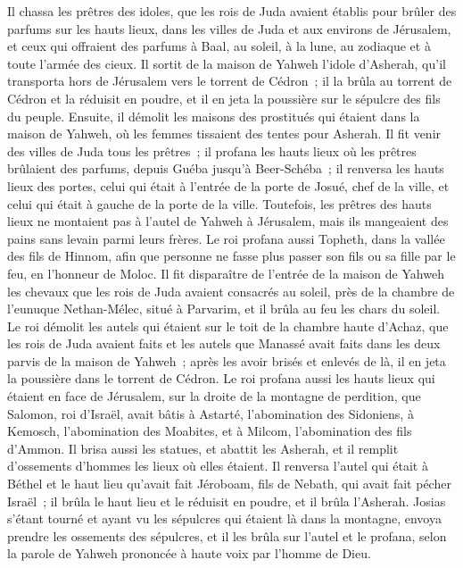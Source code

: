 \begin{multicols}{2}
Il chassa les prêtres des idoles, que les rois de Juda avaient établis pour brûler des parfums sur les hauts lieux, dans les villes de Juda et aux environs de Jérusalem, et ceux qui offraient des parfums à Baal, au soleil, à la lune, au zodiaque et à toute l'armée des cieux.
Il sortit de la maison de Yahweh l'idole d'Asherah, qu'il transporta hors de Jérusalem vers le torrent de Cédron~; il la brûla au torrent de Cédron et la réduisit en poudre, et il en jeta la poussière sur le sépulcre des fils du peuple.
Ensuite, il démolit les maisons des prostitués qui étaient dans la maison de Yahweh, où les femmes tissaient des tentes pour Asherah.
Il fit venir des villes de Juda tous les prêtres~; il profana les hauts lieux où les prêtres brûlaient des parfums, depuis Guéba jusqu'à Beer-Schéba~; il renversa les hauts lieux des portes, celui qui était à l'entrée de la porte de Josué, chef de la ville, et celui qui était à gauche de la porte de la ville.
Toutefois, les prêtres des hauts lieux ne montaient pas à l'autel de Yahweh à Jérusalem, mais ils mangeaient des pains sans levain parmi leurs frères.
Le roi profana aussi Topheth, dans la vallée des fils de Hinnom, afin que personne ne fasse plus passer son fils ou sa fille par le feu, en l'honneur de Moloc.
Il fit disparaître de l'entrée de la maison de Yahweh les chevaux que les rois de Juda avaient consacrés au soleil, près de la chambre de l'eunuque Nethan-Mélec, situé à Parvarim, et il brûla au feu les chars du soleil.
Le roi démolit les autels qui étaient sur le toit de la chambre haute d'Achaz, que les rois de Juda avaient faits et les autels que Manassé avait faits dans les deux parvis de la maison de Yahweh~; après les avoir brisés et enlevés de là, il en jeta la poussière dans le torrent de Cédron.
Le roi profana aussi les hauts lieux qui étaient en face de Jérusalem, sur la droite de la montagne de perdition, que Salomon, roi d'Israël, avait bâtis à Astarté, l'abomination des Sidoniens, à Kemosch, l'abomination des Moabites, et à Milcom, l'abomination des fils d'Ammon.
Il brisa aussi les statues, et abattit les Asherah, et il remplit d'ossements d'hommes les lieux où elles étaient.
Il renversa l'autel qui était à Béthel et le haut lieu qu'avait fait Jéroboam, fils de Nebath, qui avait fait pécher Israël~; il brûla le haut lieu et le réduisit en poudre, et il brûla l'Asherah.
Josias s'étant tourné et ayant vu les sépulcres qui étaient là dans la montagne, envoya prendre les ossements des sépulcres, et il les brûla sur l'autel et le profana, selon la parole de Yahweh prononcée à haute voix par l'homme de Dieu.

\end{multicols}
